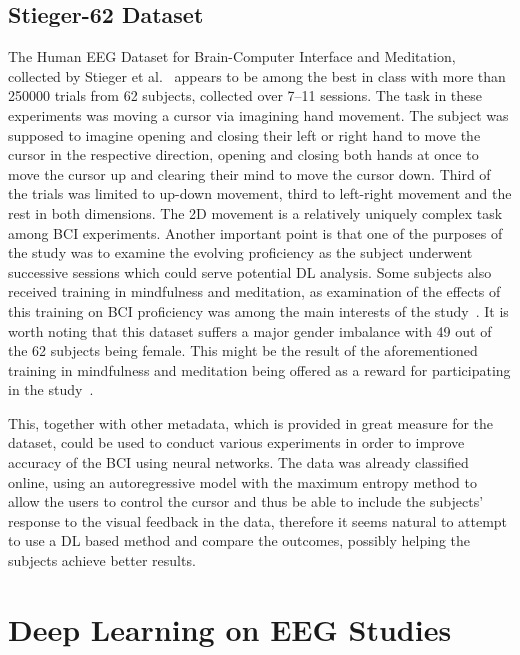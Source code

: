 \documentclass[english, he, bc, kiv, iso690alph]{fasthesis}
\begin{document}

\subsection{Stieger-62 Dataset}
\label{subsec:stieger-62}

The Human EEG Dataset for Brain-Computer Interface and Meditation, collected by Stieger et al.~\cite{data:stieger:21} appears to be among the best in class with more than 250000 trials from 62 subjects, collected over 7--11 sessions.
The task in these experiments was moving a cursor via imagining hand movement. The subject was supposed to imagine opening and closing their left or right hand to move the cursor in the respective direction, opening and closing both hands at once to move the cursor up and clearing their mind to move the cursor down. Third of the trials was limited to up-down movement, third to left-right movement and the rest in both dimensions.
The 2D movement is a relatively uniquely complex task among BCI experiments.
Another important point is that one of the purposes of the study was to examine the evolving proficiency as the subject underwent successive sessions which could serve potential DL analysis.
Some subjects also received training in mindfulness and meditation, as examination of the effects of this training on BCI proficiency was among the main interests of the study~\cite{stieger:mindfulness:20}. It is worth noting that this dataset suffers a major gender imbalance with 49 out of the 62 subjects being female. This might be the result of the aforementioned training in mindfulness and meditation being offered as a reward for participating in the study~\cite{data:stieger:21}.

This, together with other metadata, which is provided in great measure for the dataset, could be used to conduct various experiments in order to improve accuracy of the BCI using neural networks.
The data was already classified online, using an autoregressive model with the maximum entropy method to allow the users to control the cursor and thus be able to include the subjects' response to the visual feedback in the data, therefore it seems natural to attempt to use a DL based method and compare the outcomes, possibly helping the subjects achieve better results.

\section{Deep Learning on EEG Studies}
\end{document}
